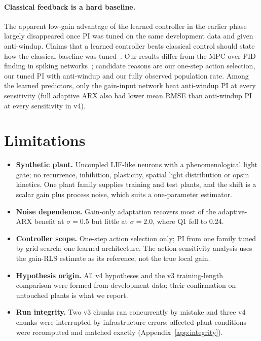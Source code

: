 \documentclass[11pt]{article}
\begin{document}
\paragraph{Classical feedback is a hard baseline.} The apparent low-gain advantage of the learned controller in the earlier phase largely disappeared once PI was tuned on the same development data and given anti-windup. Claims that a learned controller beats classical control should state how the classical baseline was tuned~\cite{kunapuli2025}. Our results differ from the MPC-over-PID finding in spiking networks~\cite{fehrman2024}; candidate reasons are our one-step action selection, our tuned PI with anti-windup and our fully observed population rate. Among the learned predictors, only the gain-input network beat anti-windup PI at every sensitivity (full adaptive ARX also had lower mean RMSE than anti-windup PI at every sensitivity in v4).

\section{Limitations}
\begin{itemize}\setlength\itemsep{2pt}
\item \textbf{Synthetic plant.} Uncoupled LIF-like neurons with a phenomenological light gate; no recurrence, inhibition, plasticity, spatial light distribution or opsin kinetics. One plant family supplies training and test plants, and the shift is a scalar gain plus process noise, which suits a one-parameter estimator.
\item \textbf{Noise dependence.} Gain-only adaptation recovers most of the adaptive-ARX benefit at $\sigma=0.5$ but little at $\sigma=2.0$, where Q1 fell to 0.24.
\item \textbf{Controller scope.} One-step action selection only; PI from one family tuned by grid search; one learned architecture. The action-sensitivity analysis uses the gain-RLS estimate as its reference, not the true local gain.
\item \textbf{Hypothesis origin.} All v4 hypotheses and the v3 training-length comparison were formed from development data; their confirmation on untouched plants is what we report.
\item \textbf{Run integrity.} Two v3 chunks ran concurrently by mistake and three v4 chunks were interrupted by infrastructure errors; affected plant-conditions were recomputed and matched exactly (Appendix~\ref{app:integrity}).
\end{itemize}
\end{document}
